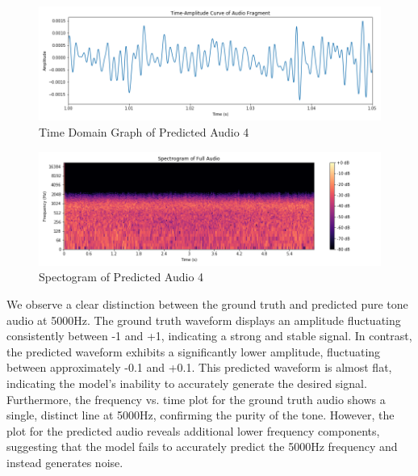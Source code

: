 \documentclass{ioereport}
\begin{document}
    \begin{figure}[H]
        \centering
        \includegraphics[width=\linewidth]{assets/audio_results/predpuretone5000hztime.png}
        \caption{Time Domain Graph of Predicted Audio 4}
        \label{fig:pred-pure5000-time}
    \end{figure}
    \begin{figure}[H]
        \centering
        \includegraphics[width=\linewidth]{assets/audio_results/predpuretone5000hzspec.png}
        \caption{Spectogram of Predicted Audio 4}
        \label{fig:pred-pure5000-spec}
    \end{figure}


    We observe a clear distinction between the ground truth and predicted pure tone audio at 5000Hz. The ground truth waveform displays an amplitude fluctuating consistently between -1 and +1, indicating a strong and stable signal. In contrast, the predicted waveform exhibits a significantly lower amplitude, fluctuating between approximately -0.1 and +0.1. This predicted waveform is almost flat, indicating the model's inability to accurately generate the desired signal. Furthermore, the frequency vs. time plot for the ground truth audio shows a single, distinct line at 5000Hz, confirming the purity of the tone. However, the plot for the predicted audio reveals additional lower frequency components, suggesting that the model fails to accurately predict the 5000Hz frequency and instead generates noise.
\end{document}
